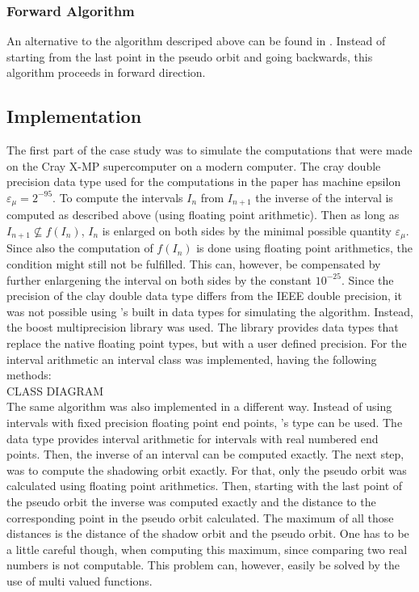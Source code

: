     \subsubsection{Forward Algorithm}
    An alternative to the algorithm descriped above can be found in \cite{chow1991}.
    Instead of starting from the last point in the pseudo orbit and going backwards, this algorithm proceeds in forward direction.
    
\subsection{Implementation}
  The first part of the case study was to simulate the computations that were made on the Cray X-MP supercomputer on a modern computer. 
  The cray double precision data type used for the computations in the paper has machine epsilon $\varepsilon_\mu = 2^{-95}$.
  To compute the intervals $I_n$ from $I_{n+1}$ the inverse of the interval is computed as described above (using floating point arithmetic).
  Then as long as $I_{n+1} \not \subseteq f(I_n)$, $I_n$ is enlarged on both sides by the minimal possible quantity $\varepsilon_\mu$. 
  Since also the computation of $f(I_n)$ is done using floating point arithmetics, the condition might still not be fulfilled.
  This can, however, be compensated by further enlargening the interval on both sides by the constant $10^{-25}$.
  Since the precision of the clay double data type differs from the IEEE double precision, it was not possible using \cc's built in data types for simulating the algorithm.
  Instead, the boost multiprecision library \cite{boostmultiprecision} was used. 
  The library provides data types that replace the native \cc floating point types, but with a user defined precision. 
  For the interval arithmetic an interval class was implemented, having the following methods:\\
  CLASS DIAGRAM \\
  The same algorithm was also implemented in a different way. 
  Instead of using intervals with fixed precision floating point end points, \irram's  type can be used. 
  The data type provides interval arithmetic for intervals with real numbered end points.
  Then, the inverse of an interval can be computed exactly.
  The next step, was to compute the shadowing orbit exactly.
  For that, only the pseudo orbit was calculated using floating point arithmetics. 
  Then, starting with the last point of the pseudo orbit the inverse was computed exactly and the distance to the corresponding point in the pseudo orbit calculated.
  The maximum of all those distances is the distance of the shadow orbit and the pseudo orbit.
  One has to be a little careful though, when computing this maximum, since comparing two real numbers is not computable. 
  This problem can, however, easily be solved by the use of multi valued functions. 
